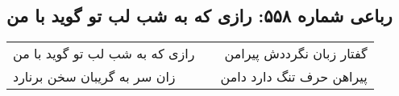 \begin{center}
\section*{رباعی شماره ۵۵۸: رازی که به شب لب تو گوید با من}
\label{sec:sh558}
\begin{longtable}{l p{0.5cm} r}
رازی که به شب لب تو گوید با من
&&
گفتار زبان نگرددش پیرامن
\\
زان سر به گریبان سخن برنارد
&&
پیراهن حرف تنگ دارد دامن
\\
\end{longtable}
\end{center}
